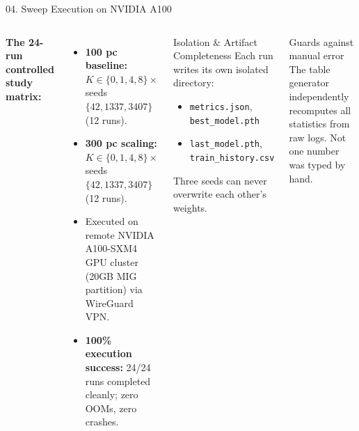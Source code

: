\documentclass[aspectratio=169]{beamer}
\begin{document}
\begin{frame}{04. Sweep Execution on NVIDIA A100}
\small
\begin{columns}[T]
\textbf{The 24-run controlled study matrix:}
\begin{itemize}\itemsep=2pt
\item \textbf{100 pc baseline:} $K \in \{0, 1, 4, 8\} \times$ seeds $\{42, 1337, 3407\}$ (12 runs).
\item \textbf{300 pc scaling:} $K \in \{0, 1, 4, 8\} \times$ seeds $\{42, 1337, 3407\}$ (12 runs).
\item Executed on remote NVIDIA A100-SXM4 GPU cluster (20GB MIG partition) via WireGuard VPN.
\item \textbf{100\% execution success:} 24/24 runs completed cleanly; zero OOMs, zero crashes.
\end{itemize}

\begin{block}{Isolation \& Artifact Completeness}
Each run writes its own isolated directory:
\begin{itemize}\itemsep=1pt
\item \texttt{metrics.json}, \texttt{best\_model.pth}
\item \texttt{last\_model.pth}, \texttt{train\_history.csv}
\end{itemize}
Three seeds can never overwrite each other's weights.
\end{block}

\begin{block}{Guards against manual error}
The table generator independently recomputes all statistics from raw logs. Not one number was typed by hand.
\end{block}
\end{columns}
\end{frame}
\end{document}
